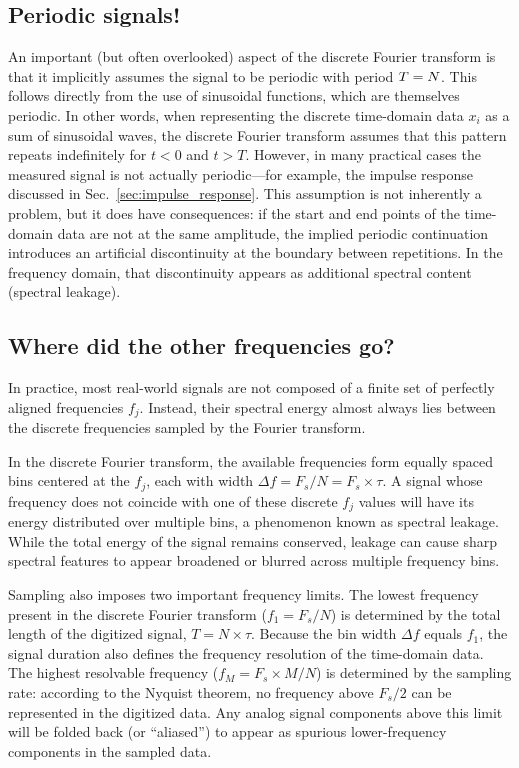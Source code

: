 \documentclass[12pt,a4paper]{article}
\providecommand{\secn}[1]{Sec.~\ref{sec:#1}}
\begin{document}
\subsection{Periodic signals!}
An important (but often overlooked) aspect of the discrete Fourier transform is that it implicitly assumes the signal to be periodic with period $T = N \time \tau$.  
This follows directly from the use of sinusoidal functions, which are themselves periodic.  
In other words, when representing the discrete time-domain data $x_i$ as a sum of sinusoidal waves, the discrete Fourier transform assumes that this pattern repeats indefinitely for $t < 0$ and $t > T$.  
However, in many practical cases the measured signal is not actually periodic—for example, the impulse response discussed in \secn{impulse_response}.  
This assumption is not inherently a problem, but it does have consequences: if the start and end points of the time-domain data are not at the same amplitude, the implied periodic continuation introduces an artificial discontinuity at the boundary between repetitions.  
In the frequency domain, that discontinuity appears as additional spectral content (spectral leakage).

\subsection{Where did the other frequencies go?}
In practice, most real-world signals are not composed of a finite set of perfectly aligned frequencies $f_j$.  
Instead, their spectral energy almost always lies between the discrete frequencies sampled by the Fourier transform.

In the discrete Fourier transform, the available frequencies form equally spaced bins centered at the $f_j$, each with width $\Delta f = F_s/N = F_s \times \tau$.
A signal whose frequency does not coincide with one of these discrete $f_j$ values will have its energy distributed over multiple bins, a phenomenon known as spectral leakage. While the total energy of the signal remains conserved, leakage can cause sharp spectral features to appear broadened or blurred across multiple frequency bins.

Sampling also imposes two important frequency limits.  
The lowest frequency present in the discrete Fourier transform ($f_1 = F_s/N$) is determined by the total length of the digitized signal, $T = N \times \tau$.  
Because the bin width $\Delta f$ equals $f_1$, the signal duration also defines the frequency resolution of the time-domain data.  
The highest resolvable frequency ($f_M = F_s \times M / N$) is determined by the sampling rate: according to the Nyquist theorem, no frequency above $F_s/2$ can be represented in the digitized data.  
Any analog signal components above this limit will be folded back (or ``aliased'') to appear as spurious lower-frequency components in the sampled data.
\end{document}
